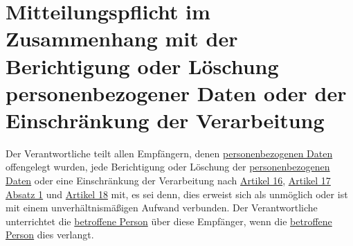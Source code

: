 \chapter{Mitteilungspflicht im Zusammenhang mit der Berichtigung oder Löschung personenbezogener Daten oder der
 Einschränkung der Verarbeitung}
\label{ch:19}


Der Verantwortliche teilt allen Empfängern, denen \hyperref[itm:04-1]{personenbezogenen Daten} offengelegt wurden, jede Berichtigung oder
Löschung der \hyperref[itm:04-1]{personenbezogenen Daten} oder eine Einschränkung der Verarbeitung nach \hyperref[ch:16]{Artikel 16},
\hyperref[itm:17-1]{Artikel 17 Absatz 1} und \hyperref[ch:18]{Artikel 18} mit, es sei denn, dies erweist sich als
unmöglich oder ist mit einem unverhältnismäßigen Aufwand verbunden. Der Verantwortliche unterrichtet die \hyperref[itm:04-1]{betroffene
Person} über diese Empfänger, wenn die \hyperref[itm:04-1]{betroffene Person} dies verlangt.


